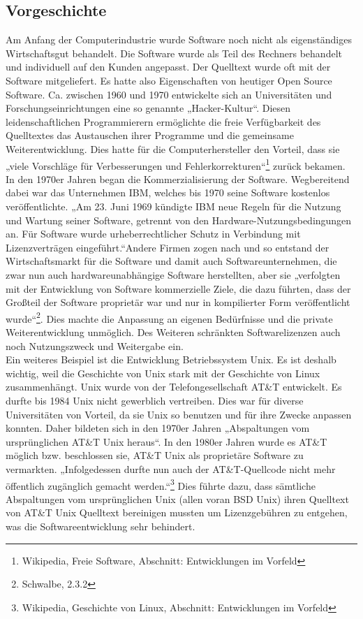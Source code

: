 \documentclass[a4paper,12pt]{article}
\begin{document}
\subsection{Vorgeschichte}
Am Anfang der Computerindustrie wurde Software noch nicht als eigenständiges Wirtschaftsgut behandelt. Die Software wurde als Teil des Rechners behandelt und individuell auf den Kunden angepasst. Der Quelltext wurde oft mit der Software mitgeliefert. Es hatte also Eigenschaften von heutiger Open Source Software. Ca. zwischen 1960 und 1970 entwickelte sich an Universitäten und Forschungseinrichtungen eine so genannte „Hacker-Kultur“. Diesen leidenschaftlichen Programmierern ermöglichte die freie Verfügbarkeit des Quelltextes das Austauschen ihrer Programme und die gemeinsame Weiterentwicklung. Dies hatte für die Computerhersteller den Vorteil, dass sie „viele Vorschläge für Verbesserungen und Fehlerkorrekturen“\footnote{Wikipedia, Freie Software, Abschnitt: Entwicklungen im Vorfeld} zurück bekamen.\\
In den 1970er Jahren began die Kommerzialisierung der Software. Wegbereitend dabei war das Unternehmen IBM, welches bis 1970 seine Software kostenlos veröffentlichte. „Am 23. Juni 1969 kündigte IBM neue Regeln für die Nutzung und Wartung seiner Software, getrennt von den Hardware-Nutzungsbedingungen an. Für Software wurde urheberrechtlicher Schutz in Verbindung mit Lizenzverträgen eingeführt.“\footnotemark[9] Andere Firmen zogen nach und so entstand der Wirtschaftsmarkt für die Software und damit auch Softwareunternehmen, die zwar nun auch hardwareunabhängige Software herstellten, aber sie „verfolgten mit der Entwicklung von Software kommerzielle Ziele, die dazu führten, dass der Großteil der Software proprietär war und nur in kompilierter Form veröffentlicht wurde“\footnote{Schwalbe, 2.3.2}. Dies machte die Anpassung an eigenen Bedürfnisse und die private Weiterentwicklung unmöglich. Des Weiteren schränkten Softwarelizenzen auch noch Nutzungszweck und Weitergabe ein.\\
Ein weiteres Beispiel ist die Entwicklung Betriebssystem Unix. Es ist deshalb wichtig, weil die Geschichte von Unix stark mit der Geschichte von Linux zusammenhängt. Unix wurde von der Telefongesellschaft AT\&T entwickelt. Es durfte bis 1984 Unix nicht gewerblich vertreiben. Dies war für diverse Universitäten von Vorteil, da sie Unix so benutzen und für ihre Zwecke anpassen konnten. Daher bildeten sich in den 1970er Jahren „Abspaltungen vom ursprünglichen AT\&T Unix heraus“\footnotemark[10]. In den 1980er Jahren wurde es AT\&T möglich bzw. beschlossen sie, AT\&T Unix als proprietäre Software zu vermarkten. „Infolgedessen durfte nun auch der AT\&T-Quellcode nicht mehr öffentlich zugänglich gemacht werden.“\footnote{Wikipedia, Geschichte von Linux, Abschnitt: Entwicklungen im Vorfeld} Dies führte dazu, dass sämtliche Abspaltungen vom ursprünglichen Unix (allen voran BSD Unix) ihren Quelltext von AT\&T Unix Quelltext bereinigen mussten um Lizenzgebühren zu entgehen, was die Softwareentwicklung sehr behindert.
\end{document}
